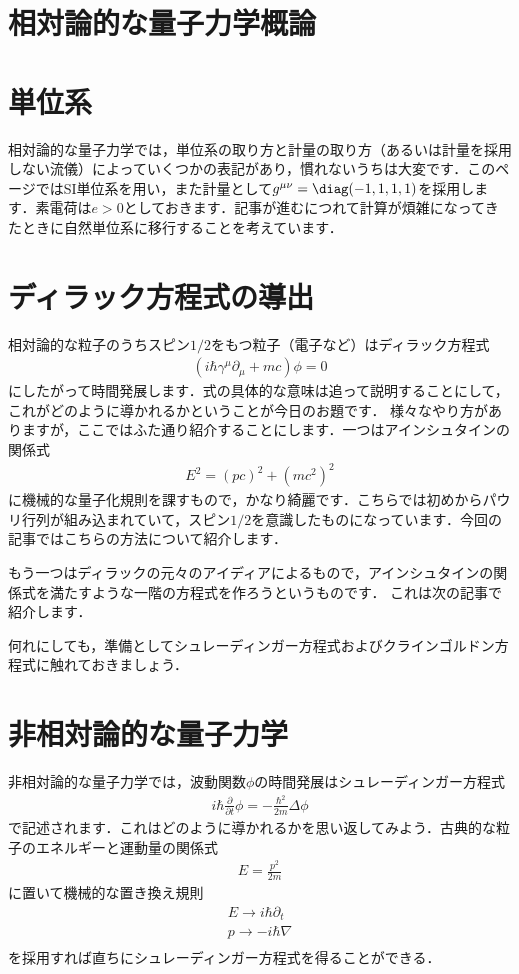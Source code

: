 \documentclass[a4j]{jarticle}
\begin{document}
\section{相対論的な量子力学概論}

\section{単位系}
相対論的な量子力学では，単位系の取り方と計量の取り方（あるいは計量を採用しない流儀）によっていくつかの表記があり，慣れないうちは大変です．このページではSI単位系を用い，また計量として$g^{\mu\nu}=\diag(-1,1,1,1)$を採用します．素電荷は$e>0$としておきます．記事が進むにつれて計算が煩雑になってきたときに自然単位系に移行することを考えています．


\section{ディラック方程式の導出}
相対論的な粒子のうちスピン$1/2$をもつ粒子（電子など）はディラック方程式
\begin{align*}
 \left(i\hbar\gamma^{\mu}\partial_{\mu}+mc\right)\phi=0
\end{align*}
にしたがって時間発展します．式の具体的な意味は追って説明することにして，これがどのように導かれるかということが今日のお題です．
様々なやり方がありますが，ここではふた通り紹介することにします．一つはアインシュタインの関係式
\begin{align*}
 E^2=(pc)^2+(mc^2)^2
\end{align*}
に機械的な量子化規則を課すもので，かなり綺麗です．こちらでは初めからパウリ行列が組み込まれていて，スピン$1/2$を意識したものになっています．今回の記事ではこちらの方法について紹介します．

もう一つはディラックの元々のアイディアによるもので，アインシュタインの関係式を満たすような一階の方程式を作ろうというものです．
これは次の記事で紹介します．





何れにしても，準備としてシュレーディンガー方程式およびクラインゴルドン方程式に触れておきましょう．


\section{非相対論的な量子力学}
非相対論的な量子力学では，波動関数$\phi$の時間発展はシュレーディンガー方程式
\begin{align*}
 i\hbar\frac{\partial}{\partial t}\phi =-\frac{\hbar^2}{2m}\Delta\phi
\end{align*}
で記述されます．これはどのように導かれるかを思い返してみよう．古典的な粒子のエネルギーと運動量の関係式
\begin{align*}
 E=\frac{p^2}{2m}
\end{align*}
に置いて機械的な置き換え規則
\begin{align*}
 E\to i\hbar\partial_t \\
 p\to -i\hbar\nabla \\
\end{align*}
を採用すれば直ちにシュレーディンガー方程式を得ることができる．
\end{document}
